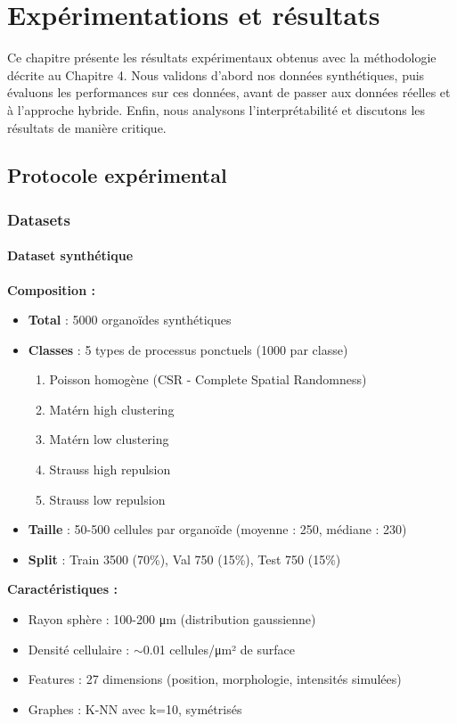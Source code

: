 
\chapter{Expérimentations et résultats}

Ce chapitre présente les résultats expérimentaux obtenus avec la méthodologie décrite au Chapitre 4. Nous validons d'abord nos données synthétiques, puis évaluons les performances sur ces données, avant de passer aux données réelles et à l'approche hybride. Enfin, nous analysons l'interprétabilité et discutons les résultats de manière critique.

\section{Protocole expérimental}

\subsection{Datasets}

\subsubsection{Dataset synthétique}

\textbf{Composition :}
\begin{itemize}
    \item \textbf{Total} : 5000 organoïdes synthétiques
    \item \textbf{Classes} : 5 types de processus ponctuels (1000 par classe)
    \begin{enumerate}
        \item Poisson homogène (CSR - Complete Spatial Randomness)
        \item Matérn high clustering
        \item Matérn low clustering
        \item Strauss high repulsion
        \item Strauss low repulsion
    \end{enumerate}
    \item \textbf{Taille} : 50-500 cellules par organoïde (moyenne : 250, médiane : 230)
    \item \textbf{Split} : Train 3500 (70\%), Val 750 (15\%), Test 750 (15\%)
\end{itemize}

\textbf{Caractéristiques :}
\begin{itemize}
    \item Rayon sphère : 100-200 μm (distribution gaussienne)
    \item Densité cellulaire : $\sim$0.01 cellules/μm² de surface
    \item Features : 27 dimensions (position, morphologie, intensités simulées)
    \item Graphes : K-NN avec k=10, symétrisés
\end{itemize}

